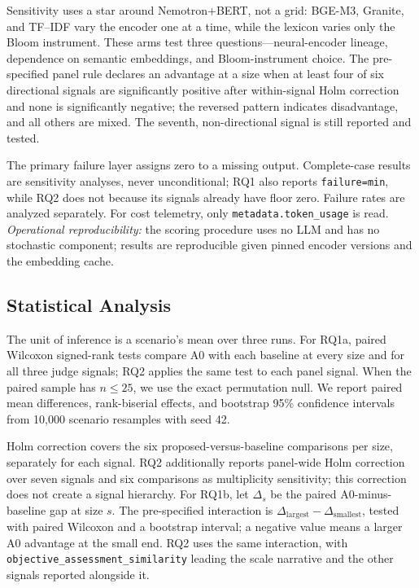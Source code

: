 Sensitivity uses a star around Nemotron+BERT, not a grid: BGE-M3, Granite, and
TF--IDF vary the encoder one at a time, while the lexicon varies only the Bloom
instrument. These arms test three questions---neural-encoder lineage, dependence on
semantic embeddings, and Bloom-instrument choice. The pre-specified panel rule
declares an advantage at a size when at least four of six directional signals are
significantly positive after within-signal Holm correction and none is significantly
negative; the reversed pattern indicates disadvantage, and all others are mixed.
The seventh, non-directional signal is still reported and tested.

The primary failure layer assigns zero to a missing output. Complete-case results
are sensitivity analyses, never unconditional; RQ1 also reports
\texttt{failure=min}, while RQ2 does not because its signals already have floor
zero. Failure rates are analyzed separately. For cost telemetry, only
\texttt{metadata.token\_usage} is read. \emph{Operational reproducibility:} the scoring procedure uses no LLM and has no stochastic component; results are reproducible given pinned encoder versions and the embedding cache.

\subsection{Statistical Analysis}
\label{sec:stats}

The unit of inference is a scenario's mean over three runs. For RQ1a, paired
Wilcoxon signed-rank tests compare A0 with each baseline at every size and for all
three judge signals; RQ2 applies the same test to each panel signal. When the paired
sample has $n\leq25$, we use the exact permutation null. We report paired mean
differences, rank-biserial effects, and bootstrap 95\% confidence intervals from
10{,}000 scenario resamples with seed 42.

Holm correction covers the six proposed-versus-baseline comparisons per size,
separately for each signal. RQ2 additionally reports panel-wide Holm correction
over seven signals and six comparisons as multiplicity sensitivity; this correction
does not create a signal hierarchy. For RQ1b, let $\Delta_s$ be the paired
A0-minus-baseline gap at size $s$. The pre-specified interaction is
$\Delta_{\mathrm{largest}}-\Delta_{\mathrm{smallest}}$, tested with paired Wilcoxon
and a bootstrap interval; a negative value means a larger A0 advantage at the small
end. RQ2 uses the same interaction, with
\texttt{objective\_assessment\_similarity} leading the scale narrative and the
other signals reported alongside it.

